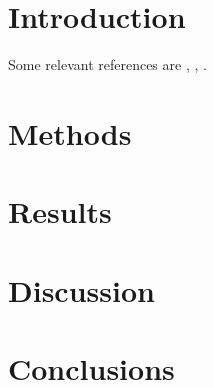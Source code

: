 \documentclass[letterpaper,12pt,preprint]{aastex}
\newcommand{\sectlabel}[1]{\label{sect:#1}}
\begin{document}
\section{Introduction}
\sectlabel{introduction}

Some relevant references are \citet{Vanderplas2015}, \citet{Sesar2010}, \citet{Oluseyi12}.

\section{Methods}
\sectlabel{methods}

\section{Results}
\sectlabel{results}

\section{Discussion}
\sectlabel{discussion}

\section{Conclusions}
\sectlabel{conclusion}



\end{document}
